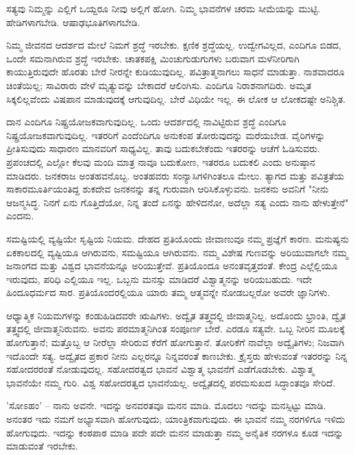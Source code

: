 ಸತ್ಯವು ನಿಮ್ಮನ್ನು ಎಲ್ಲಿಗೆ ಒಯ್ದರೂ ನೀವು ಅಲ್ಲಿಗೆ ಹೋಗಿ. ನಿಮ್ಮ ಭಾವನೆಗಳ ಚರಮ ಸೀಮೆಯನ್ನು ಮುಟ್ಟಿ. ಹೇಡಿಗಳಾಗಬೇಡಿ. ಆಷಾಢಭೂತಿಗಳಾಗಬೇಡಿ.

ನಿಮ್ಮ ಜೀವನದ ಆದರ್ಶದ ಮೇಲೆ ನಿಮಗೆ ಶ್ರದ್ಧೆ ಇರಬೇಕು. ಕ್ಷಣಿಕ ಶ್ರದ್ಧೆಯಲ್ಲ. ಉದ್ವೇಗವಿಲ್ಲದ, ಎಂದಿಗೂ ಬಿಡದ, ಒಂದೇ ಸಮನಾಗಿರುವ ಶ್ರದ್ಧೆ ಇರಬೇಕು. ಚಾತಕಪಕ್ಷಿ ಮಿಂಚುಗುಡುಗುಗಳು ಬರುವಾಗ ಮಳೆನೀರಿಗಾಗಿ ಕಾಯುತ್ತಿರುವುದೇ ಹೊರತು ಬೇರೆ ನೀರನ್ನೇ ಕುಡಿಯುವುದಿಲ್ಲ. ಪವಿತ್ರಾತ್ಮನಾಗಲು ಸಾಧನೆ ಮಾಡುತ್ತಾ. ನಾಶವಾದರೂ ಚಿಂತೆಯಿಲ್ಲ; ಸಾವಿರಾರು ವೇಳೆ ಮೃತ್ಯುವನ್ನು ಬೇಕಾದರೆ ಆಲಿಂಗಿಸು. ಎಂದಿಗೂ ನಿರಾಶನಾಗದಿರು. ಅಮೃತ ಸಿಕ್ಕಲಿಲ್ಲವೆಂದು ವಿಷಪಾನ ಮಾಡುವುದಕ್ಕೆ ಆಗುವುದಿಲ್ಲ. ಬೇರೆ ವಿಧಿಯೇ ಇಲ್ಲ. ಈ ಲೋಕ ಆ ಲೋಕದಷ್ಟೇ ಅನಿಶ್ಚಿತ.

ದಾನ ಎಂದಿಗೂ ನಿಷ್ಪ್ರಯೋಜಕವಾಗುವುದಿಲ್ಲ. ಒಂದು ಆದರ್ಶದಲ್ಲಿ ನಾವಿಟ್ಟಿರುವ ಶ್ರದ್ಧೆ ಎಂದಿಗೂ ನಿಷ್ಪ್ರಯೋಜಕವಾಗುವುದಿಲ್ಲ. ಇತರರಿಗೆ ಎಂದೆಂದಿಗೂ ಅನುಕಂಪ ತೋರುವುದನ್ನು ಮರೆಯಬೇಡ. ವೈರಿಗಳನ್ನು ಪ್ರೀತಿಸುವುದು ಸಾಧಾರಣ ಮಾನವರಿಗೆ ಸಾಧ್ಯವಿಲ್ಲ. ತಾವು ಬದುಕಬೇಕೆಂದು ಇತರರನ್ನು ಆಚೆಗೆ ಓಡಿಸುವರು. ಪ್ರಪಂಚದಲ್ಲಿ ಎಲ್ಲೋ ಕೆಲವು ಮಂದಿ ಮಾತ್ರ ನಾವೂ ಬದುಕೋಣ, ಇತರರೂ ಬದುಕಲಿ ಎಂದು ಅನುಷ್ಠಾನ ಮಾಡಿದರು. ಜನಕರಾಜ ಅಂತಹವನೊಬ್ಬ. ಅಂತಹವರು ಸಂನ್ಯಾಸಿಗಳಿಗಿಂತಲೂ ಮೇಲು. ತ್ಯಾಗದ ಮತ್ತು ಪವಿತ್ರತೆಯ ಸಾಕಾರಮೂರ್ತಿಯಂತಿದ್ದ ಶುಕದೇವ ಜನಕನನ್ನು ತನ್ನ ಗುರುವಾಗಿ ಆರಿಸಿಕೊಳ್ಳುವನು. ಜನಕನು ಅವನಿಗೆ "ನೀನು ಆಜನ್ಮಸಿದ್ಧ. ನಿನಗೆ ಏನು ಗೊತ್ತಿದೆಯೋ, ನಿನ್ನ ತಂದೆ ಏನನ್ನು ಹೇಳಿದನೋ, ಅದೆಲ್ಲಾ ಸತ್ಯ ಎಂದು ನಾನು ಹೇಳುತ್ತೇನೆ" ಎಂದನು.

ಸಮಷ್ಟಿಯಲ್ಲಿ ವ್ಯಷ್ಟಿಯೇ ಸೃಷ್ಟಿಯ ನಿಯಮ. ದೇಹದ ಪ್ರತಿಯೊಂದು ಜೀವಾಣುವೂ  ನಮ್ಮ ಪ್ರಜ್ಞೆಗೆ ಕಾರಣ. ಮನುಷ್ಯನು ಏಕಕಾಲದಲ್ಲಿ ವ್ಯಷ್ಟಿಯೂ ಆಗಿರುವನು, ಸಮಷ್ಟಿಯೂ ಆಗಿರುವನು. ನಮ್ಮ ವಿಶೇಷ ಗುಣವನ್ನು ಅರಿಯುವಾಗಲೇ ನಮ್ಮ ಜನಾಂಗದ ಮತ್ತು ವಿಶ್ವದ ಭಾವನೆಯನ್ನೂ ಅರಿಯುತ್ತೇವೆ. ಪ್ರತಿಯೊಂದೂ ಅನಂತವೃತ್ತದಂತೆ. ಕೇಂದ್ರ ಎಲ್ಲೆಲ್ಲಿಯೂ ಇರುವುದು, ಪರಿಧಿ ಎಲ್ಲಿಯೂ ಇಲ್ಲ. ಒಬ್ಬನು ಮನಸ್ಸು ಮಾಡಿದರೆ ವಿಶ್ವಾತ್ಮನನ್ನು ಅರಿಯಬಹುದು. ಇದೇ ಹಿಂದೂಧರ್ಮದ ಸಾರ. ಪ್ರತಿಯೊಂದರಲ್ಲಿಯೂ ಯಾರು ತಮ್ಮ ಆತ್ಮವನ್ನೇ ನೋಡಬಲ್ಲರೋ ಅವರೇ ಜ್ಞಾನಿಗಳು.

ಆಧ್ಯಾತ್ಮಿಕ ನಿಯಮಗಳನ್ನು ಕಂಡುಹಿಡಿದವರೇ ಋಷಿಗಳು. ಅದ್ವೈತ ತತ್ತ್ವದಲ್ಲಿ ಜೀವಾತ್ಮನಿಲ್ಲ. ಅದೊಂದು ಭ್ರಾಂತಿ, ದ್ವೈತ ತತ್ತ್ವದಲ್ಲಿ ಜೀವಾತ್ಮನಿರುವನು. ಅವನು ಪರಮಾತ್ಮನಿಗಿಂತ ಸಂಪೂರ್ಣ ಬೇರೆ. ಎರಡೂ ಸತ್ಯವೇ. ಒಬ್ಬ ನೀರಿನ ಮೂಲಕ್ಕೆ ಹೋಗುತ್ತಾನೆ; ಮತ್ತೊಬ್ಬ ಆ ನೀರೆಲ್ಲಾ ಸೇರಿರುವ ಕೆರೆಗೆ ಹೋಗುತ್ತಾನೆ. ತೋರಿಕೆಗೆ ನಾವೆಲ್ಲಾ ಅದ್ವೈತಿಗಳು; ನಿಜವಾಗಿ ಇದೊಂದೇ ಸತ್ಯ. ಅದ್ವೈತದ ಪ್ರಕಾರ ನೀನು ಎಲ್ಲರನ್ನೂ ನಿನ್ನವರಂತೆ ಕಾಣಬೇಕು. ಕ್ರೈಸ್ತರು ಹೇಳುವಂತೆ ಇತರರನ್ನು ನಿನ್ನ ಸಹೋದರರಂತೆ ನೋಡುವುದಲ್ಲ. ಸಹೋದರತ್ವದ ಭಾವನೆ ವಿಶ್ವಾತ್ಮ ಭಾವನೆಗೆ ಎಡೆಗೊಡಬೇಕು. ವಿಶ್ವಾತ್ಮ ಭಾವನೆಯೇ ನಮ್ಮ ಗುರಿ. ವಿಶ್ವ ಸಹೋದರತ್ವದ ಭಾವನೆಯಲ್ಲ. ಅದ್ವೈತದಲ್ಲಿ ಪರಮಸುಖದ ಸಿದ್ಧಾಂತವೂ ಸೇರಿದೆ.

'ಸೋಽಹಂ' – ನಾನು ಅವನೇ. ಇದನ್ನು ಅನವರತವೂ ಮನನ ಮಾಡಿ. ಮೊದಲು ಇದನ್ನು ಮನಸ್ಸಿಟ್ಟು ಮಾಡಿ. ಅನಂತರ ಇದು ನಮಗೆ ಅಭ್ಯಾಸವಾಗಿ ಹೋಗುವುದು, ಯಾಂತ್ರಿಕವಾಗುವುದು. ಈ ಭಾವನೆ ನಮ್ಮ ನರಗಳಿಗೂ ಇಳಿದು ಹೋಗುವುದು. ಇದನ್ನು ಕಂಠಪಾಠ ಮಾಡಿ ಪದೇ ಪದೇ ಮನನ ಮಾಡುತ್ತಾ ನಮ್ಮ ಅನೈತಿಕ ನರಗಳೂ ಕೂಡ ಇದನ್ನು ಮಾಡುವಂತೆ ಇರಬೇಕು.

